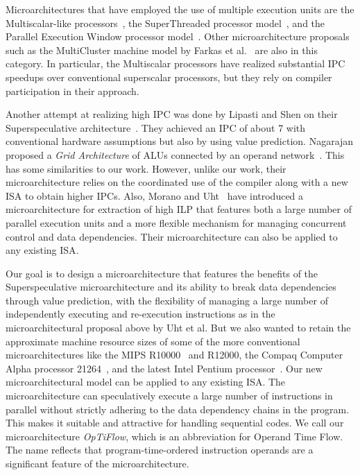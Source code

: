 \documentclass[10pt,dvips]{article}
\begin{document}
Microarchitectures that have employed the
use of multiple execution units are the Multiscalar-like
processors~\cite{Sohi95,sundararaman97multiscalar},
the SuperThreaded processor model~\cite{tsai96superthread},
and
the Parallel Execution Window processor model~\cite{kemp96pew}.
Other microarchitecture proposals such as the MultiCluster machine
model by 
Farkas et al.~\cite{farkas97multicluster} are also in this category.
In particular, the Multiscalar processors have
realized substantial IPC speedups over conventional superscalar
processors, but they rely on compiler participation in their
approach.

Another attempt at realizing high IPC was done by
Lipasti and Shen on their Superspeculative
architecture~\cite{Lip97}.  They achieved an IPC of
about 7 with conventional hardware assumptions but
also by using value prediction.
Nagarajan proposed a {\em Grid Architecture} of ALUs
connected by an operand network~\cite{Nag01}.  
This has some similarities to our work.
However, unlike our work, their microarchitecture
relies on the coordinated use of the compiler along with
a new ISA to obtain higher IPCs.
Also, Morano and Uht~\cite{morano02high,uht02realizing}
have introduced a microarchitecture for extraction of
high ILP that features both
a large number of parallel execution units and a more flexible
mechanism for managing concurrent control and data dependencies.
Their microarchitecture can also be applied to any existing ISA.

Our goal is to design a microarchitecture
that features the benefits of the Superspeculative 
microarchitecture and its ability to break data
dependencies through value prediction, with the flexibility
of managing a large number of independently executing and re-execution
instructions as in the microarchitectural proposal above by Uht et al.  
But we also wanted to retain the approximate machine resource
sizes of some of the
more conventional microarchitectures like the
MIPS R10000~\cite{yeager96r10000} and R12000, 
the Compaq Computer 
Alpha processor 21264~\cite{Kessler98,leibholz97alpha},
and the latest Intel Pentium processor~\cite{hinton01pentium}.
Our new microarchitectural model can
be applied to any existing ISA.  
The microarchitecture can speculatively execute a large
number of instructions in parallel without strictly adhering to
the data dependency chains in the program.  This makes it
suitable and attractive for handling sequential codes.
We call our microarchitecture \textit{OpTiFlow}, which
is an abbreviation for Operand Time Flow.
The name reflects that program-time-ordered instruction operands
are a significant feature of the microarchitecture.
\end{document}

